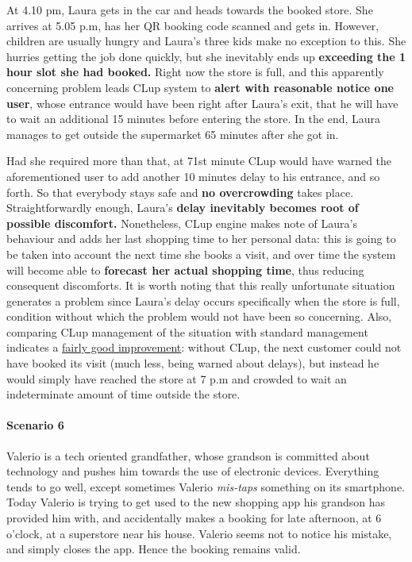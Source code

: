 At 4.10 pm, Laura gets in the car and heads towards the booked store. She arrives at 5.05 p.m, has her QR booking code scanned and gets in. \newline
However, children are usually hungry and Laura's three kids make no exception to this. She hurries getting the job done quickly, but she inevitably ends up \textbf{exceeding the 1 hour slot she had booked.} \newline
Right now the store is full, and this apparently concerning problem leads CLup system to \textbf{alert with reasonable notice one user}, whose entrance would have been right after Laura's exit, that he will have to wait an additional 15 minutes before entering the store. \newline
In the end, Laura manages to get outside the supermarket 65 minutes after she got in. 


Had she required more than that, at 71st minute CLup would have warned the aforementioned user to add another 10 minutes delay to his entrance, and so forth. So that everybody stays safe and \textbf{no overcrowding} takes place.\newline
Straightforwardly enough, Laura's \textbf{delay inevitably becomes root of possible discomfort.} Nonetheless, CLup engine makes note of Laura's behaviour and adds her last shopping time to her personal data: this is going to be taken into account the next time she books a visit, and over time the system will become able to \textbf{forecast her actual shopping time}, thus reducing consequent discomforts.\newline
It is worth noting that this really unfortunate situation generates a problem since Laura's delay occurs specifically when the store is full, condition without which the problem would not have been so concerning.\newline
Also, comparing CLup management of the situation with standard management indicates a \underline{fairly good improvement}: without CLup, the next customer could not have booked its visit (much less, being warned about delays), but instead he would simply have reached the store at 7 p.m and crowded to wait an indeterminate amount of time outside the store.

\paragraph{Scenario 6}
Valerio is a tech oriented grandfather, whose grandson is committed about technology and pushes him towards the use of electronic devices.\newline
Everything tends to go well, except sometimes Valerio \textit{mis-taps} something on its smartphone. Today Valerio is trying to get used to the new shopping app his grandson has provided him with, and accidentally makes a booking for late afternoon, at 6 o'clock, at a superstore near his house.\newline
Valerio seems not to notice his mistake, and simply closes the app. Hence the booking remains valid.

